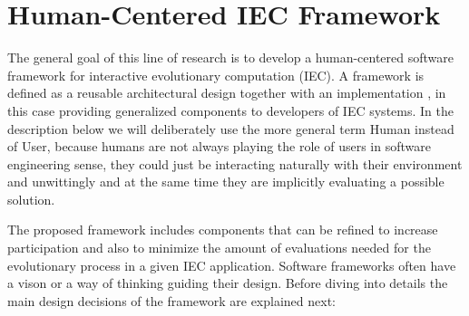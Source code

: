 \section{Human-Centered IEC Framework}
\label{sec:framework}
The general goal of this line of research is to develop a human-centered \cite{gasson2003human} 
software framework for interactive evolutionary computation (IEC). 
A framework is defined as a reusable architectural design together
with an implementation \cite{campbell1991choices}, in this case 
providing generalized components to developers of IEC systems. In the
description below %
 we will deliberately use the more general 
term Human instead of User, because humans are not always playing the role of users in software engineering sense, they
could just be interacting naturally with their environment and
unwittingly and at the same time they are implicitly
evaluating a possible solution. 

The proposed framework includes components that can be refined to increase
participation and also to minimize the amount of evaluations needed for the evolutionary 
process in a given IEC application. Software frameworks often have a vison or a way 
of thinking \cite{carneiro2010introducing} guiding their
design. Before diving into details the main design decisions of the
framework are explained next:  %

